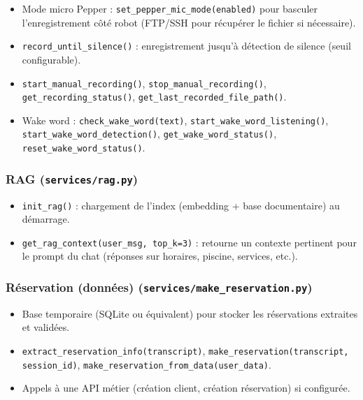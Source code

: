 \documentclass[12pt,a4paper]{article}
\begin{document}
\begin{itemize}[noitemsep]
  \item Mode micro Pepper : \texttt{set\_pepper\_mic\_mode(enabled)} pour basculer l'enregistrement côté robot (FTP/SSH pour récupérer le fichier si nécessaire).
  \item \texttt{record\_until\_silence()} : enregistrement jusqu'à détection de silence (seuil configurable).
  \item \texttt{start\_manual\_recording()}, \texttt{stop\_manual\_recording()}, \texttt{get\_recording\_status()}, \texttt{get\_last\_recorded\_file\_path()}.
  \item Wake word : \texttt{check\_wake\_word(text)}, \texttt{start\_wake\_word\_listening()}, \texttt{start\_wake\_word\_detection()}, \texttt{get\_wake\_word\_status()}, \texttt{reset\_wake\_word\_status()}.
\end{itemize}

\subsubsection{RAG (\texttt{services/rag.py})}

\begin{itemize}[noitemsep]
  \item \texttt{init\_rag()} : chargement de l'index (embedding + base documentaire) au démarrage.
  \item \texttt{get\_rag\_context(user\_msg, top\_k=3)} : retourne un contexte pertinent pour le prompt du chat (réponses sur horaires, piscine, services, etc.).
\end{itemize}

\subsubsection{Réservation (données) (\texttt{services/make\_reservation.py})}

\begin{itemize}[noitemsep]
  \item Base temporaire (SQLite ou équivalent) pour stocker les réservations extraites et validées.
  \item \texttt{extract\_reservation\_info(transcript)}, \texttt{make\_reservation(transcript, session\_id)}, \texttt{make\_reservation\_from\_data(user\_data)}.
  \item Appels à une API métier (création client, création réservation) si configurée.
\end{itemize}
\end{document}
